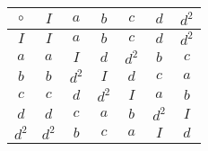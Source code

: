 \begin{tabular}{c|cccccc}
$\circ$&$I$&$a$&$b$&$c$&$d$&$d^2$\\
\hline
$I$&$I$&$a$&$b$&$c$&$d$&$d^2$\\
$a$&$a$&$I$&$d$&$d^2$&$b$&$c$\\
$b$&$b$&$d^2$&$I$&$d$&$c$&$a$\\
$c$&$c$&$d$&$d^2$&$I$&$a$&$b$\\
$d$&$d$&$c$&$a$&$b$&$d^2$&$I$\\
$d^2$&$d^2$&$b$&$c$&$a$&$I$&$d$\\
\end{tabular}
